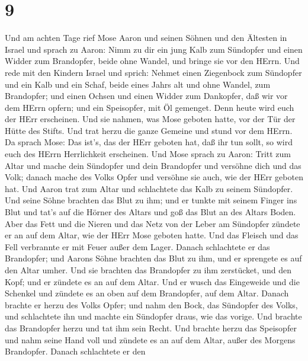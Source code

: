 \hypertarget{section-8}{%
\section{9}\label{section-8}}

 Und am achten Tage rief Mose Aaron und seinen Söhnen und
den Ältesten in Israel  und sprach zu Aaron: Nimm zu dir ein
jung Kalb zum Sündopfer und einen Widder zum Brandopfer, beide ohne
Wandel, und bringe sie vor den HErrn.  Und rede mit den
Kindern Israel und sprich: Nehmet einen Ziegenbock zum Sündopfer und ein
Kalb und ein Schaf, beide eines Jahrs alt und ohne Wandel, zum
Brandopfer;  und einen Ochsen und einen Widder zum
Dankopfer, daß wir vor dem HErrn opfern; und ein Speisopfer, mit Öl
gemenget. Denn heute wird euch der HErr erscheinen.  Und sie
nahmen, was Mose geboten hatte, vor der Tür der Hütte des Stifts. Und
trat herzu die ganze Gemeine und stund vor dem HErrn.  Da
sprach Mose: Das ist's, das der HErr geboten hat, daß ihr tun sollt, so
wird euch des HErrn Herrlichkeit erscheinen.  Und Mose
sprach zu Aaron: Tritt zum Altar und mache dein Sündopfer und dein
Brandopfer und versöhne dich und das Volk; danach mache des Volks Opfer
und versöhne sie auch, wie der HErr geboten hat.  Und Aaron
trat zum Altar und schlachtete das Kalb zu seinem Sündopfer.
 Und seine Söhne brachten das Blut zu ihm; und er tunkte mit
seinem Finger ins Blut und tat's auf die Hörner des Altars und goß das
Blut an des Altars Boden.  Aber das Fett und die Nieren und
das Netz von der Leber am Sündopfer zündete er an auf dem Altar, wie der
HErr Mose geboten hatte.  Und das Fleisch und das Fell
verbrannte er mit Feuer außer dem Lager.  Danach
schlachtete er das Brandopfer; und Aarons Söhne brachten das Blut zu
ihm, und er sprengete es auf den Altar umher.  Und sie
brachten das Brandopfer zu ihm zerstücket, und den Kopf; und er zündete
es an auf dem Altar.  Und er wusch das Eingeweide und die
Schenkel und zündete es an oben auf dem Brandopfer, auf dem Altar.
 Danach brachte er herzu des Volks Opfer; und nahm den
Bock, das Sündopfer des Volks, und schlachtete ihn und machte ein
Sündopfer draus, wie das vorige.  Und brachte das
Brandopfer herzu und tat ihm sein Recht.  Und brachte herzu
das Speisopfer und nahm seine Hand voll und zündete es an auf dem Altar,
außer des Morgens Brandopfer.  Danach schlachtete er den
